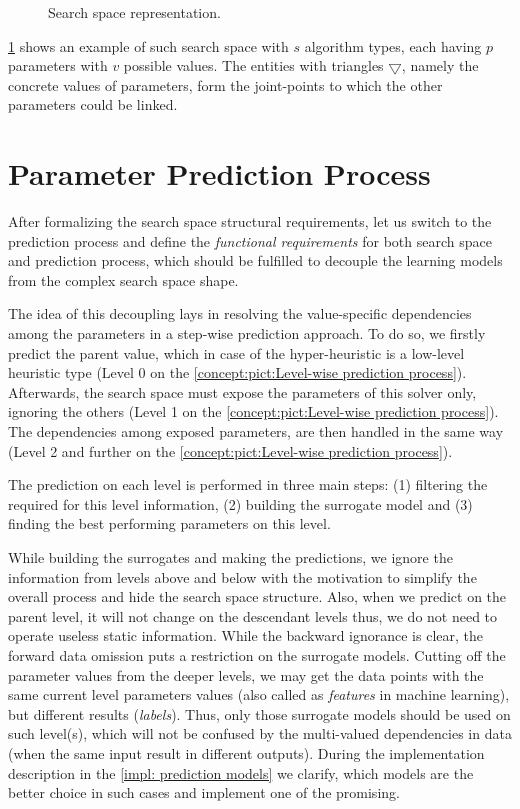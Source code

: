 \begin{figure}
	\centering
	
	\caption{Search space representation.}
	\label{concept:pict:Search Space Representation}
\end{figure}

\cref{concept:pict:Search Space Representation} shows an example of such search space with $s$ algorithm types, each having $p$ parameters with $v$ possible values. The entities with triangles $\bigtriangledown$, namely the concrete values of parameters, form the joint-points to which the other parameters could be linked. 


\section{Parameter Prediction Process}\label{concept:prediction}
After formalizing the search space structural requirements, let us switch to the prediction process and define the  \emph{functional requirements} for both search space and prediction process, which should be fulfilled to decouple the learning models from the complex search space shape.

The idea of this decoupling lays in resolving the value-specific dependencies among the parameters in a step-wise prediction approach. To do so, we firstly predict the parent value, which in case of the hyper-heuristic is a low-level heuristic type (Level 0 on the \cref{concept:pict:Level-wise prediction process}). Afterwards, the search space must expose the parameters of this solver only, ignoring the others (Level 1 on the \cref{concept:pict:Level-wise prediction process}). The dependencies among exposed parameters, are then handled in the same way (Level 2 and further on the \cref{concept:pict:Level-wise prediction process}).

The prediction on each level is performed in three main steps: (1) filtering the required for this level information, (2) building the surrogate model and (3) finding the best performing parameters on this level.

While building the surrogates and making the predictions, we ignore the information from levels above and below with the motivation to simplify the overall process and hide the search space structure. Also, when we predict on the parent level, it will not change on the descendant levels thus, we do not need to operate useless static information. While the backward ignorance is clear, the forward data omission puts a restriction on the surrogate models. Cutting off the parameter values from the deeper levels, we may get the data points with the same current level parameters values (also called as \emph{features} in machine learning), but different results (\emph{labels}). Thus, only those surrogate models should be used on such level(s), which will not be confused by the multi-valued dependencies in data (when the same input result in different outputs). During the implementation description in the \cref{impl: prediction models} we clarify, which models are the better choice in such cases and implement one of the promising.

